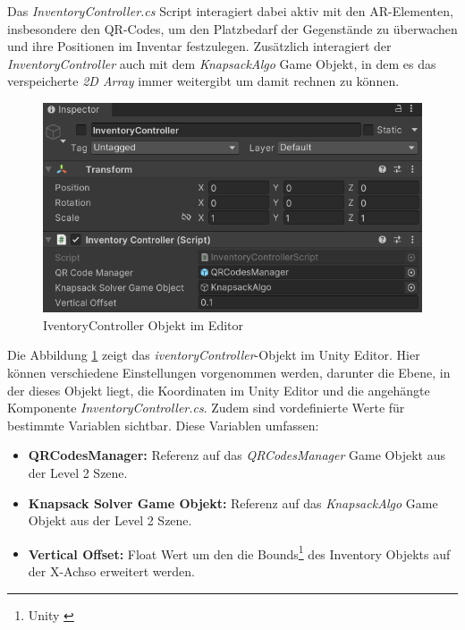 Das \textit{InventoryController.cs} Script interagiert dabei aktiv mit den AR-Elementen, insbesondere den QR-Codes, um
den Platzbedarf der Gegenstände zu überwachen und ihre Positionen im Inventar festzulegen. Zusätzlich interagiert der
\textit{InventoryController} auch mit dem \textit{KnapsackAlgo} Game Objekt, in dem es das verspeicherte \textit{2D Array}
immer weitergibt um damit rechnen zu können.\\

\begin{figure}[h]
    \centering
    \includegraphics[scale=0.8]{images/invCon_Editor}
    \caption{IventoryController Objekt im Editor}
    \label{fig:InventoryController_Editor}
\end{figure}

Die Abbildung \ref{fig:InventoryController_Editor} zeigt das \textit{iventoryController}-Objekt im Unity Editor.  Hier
können verschiedene Einstellungen vorgenommen werden, darunter die Ebene, in der dieses Objekt liegt, die Koordinaten
im Unity Editor und die angehängte Komponente \textit{InventoryController.cs}. Zudem sind vordefinierte Werte für bestimmte
Variablen sichtbar. Diese Variablen umfassen:

\begin{itemize}
    \item \textbf{QRCodesManager:} Referenz auf das \textit{QRCodesManager} Game Objekt aus der Level 2 Szene.
    \item \textbf{Knapsack Solver Game Objekt:} Referenz auf das \textit{KnapsackAlgo} Game Objekt aus der Level 2 Szene.
    \item \textbf{Vertical Offset:} Float Wert um den die Bounds\footnote{Unity \cite{Bounds}} des Inventory Objekts auf der X-Achso erweitert werden.\\
\end{itemize}


